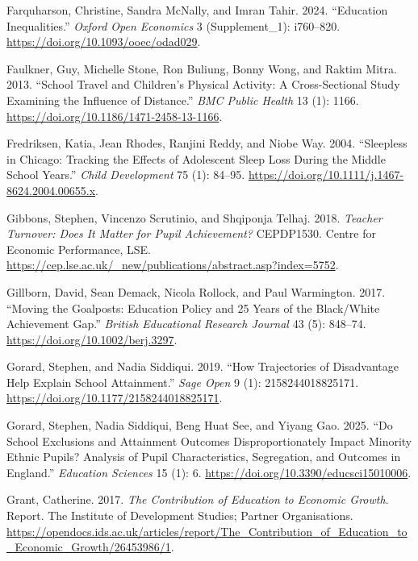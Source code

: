 \documentclass[
  12pt,
  titlepage]{article}
\newlength{\cslhangindent}
\newenvironment{CSLReferences}[2] %
 {\begin{list}{}{%
  \setlength{\itemindent}{0pt}
  \setlength{\leftmargin}{0pt}
  \setlength{\parsep}{0pt}
  \ifodd #1
   \setlength{\leftmargin}{\cslhangindent}
   \setlength{\itemindent}{-1\cslhangindent}
  \fi
  \setlength{\itemsep}{#2\baselineskip}}}
 {\end{list}}
\begin{document}
\begin{CSLReferences}{1}{1}
Farquharson, Christine, Sandra McNally, and Imran Tahir. 2024.
{``Education Inequalities.''} \emph{Oxford Open Economics} 3
(Supplement\_1): i760--820. \url{https://doi.org/10.1093/ooec/odad029}.

Faulkner, Guy, Michelle Stone, Ron Buliung, Bonny Wong, and Raktim
Mitra. 2013. {``School Travel and Children's Physical Activity: A
Cross-Sectional Study Examining the Influence of Distance.''} \emph{BMC
Public Health} 13 (1): 1166.
\url{https://doi.org/10.1186/1471-2458-13-1166}.

Fredriksen, Katia, Jean Rhodes, Ranjini Reddy, and Niobe Way. 2004.
{``Sleepless in {Chicago}: Tracking the Effects of Adolescent Sleep Loss
During the Middle School Years.''} \emph{Child Development} 75 (1):
84--95. \url{https://doi.org/10.1111/j.1467-8624.2004.00655.x}.

Gibbons, Stephen, Vincenzo Scrutinio, and Shqiponja Telhaj. 2018.
\emph{Teacher Turnover: Does It Matter for Pupil Achievement?}
CEPDP1530. Centre for Economic Performance, LSE.
\url{https://cep.lse.ac.uk/_new/publications/abstract.asp?index=5752}.

Gillborn, David, Sean Demack, Nicola Rollock, and Paul Warmington. 2017.
{``Moving the Goalposts: {Education} Policy and 25 Years of the
{Black}/{White} Achievement Gap.''} \emph{British Educational Research
Journal} 43 (5): 848--74. \url{https://doi.org/10.1002/berj.3297}.

Gorard, Stephen, and Nadia Siddiqui. 2019. {``How {Trajectories} of
{Disadvantage} {Help} {Explain} {School} {Attainment}.''} \emph{Sage
Open} 9 (1): 2158244018825171.
\url{https://doi.org/10.1177/2158244018825171}.

Gorard, Stephen, Nadia Siddiqui, Beng Huat See, and Yiyang Gao. 2025.
{``Do {School} {Exclusions} and {Attainment} {Outcomes}
{Disproportionately} {Impact} {Minority} {Ethnic} {Pupils}? {Analysis}
of {Pupil} {Characteristics}, {Segregation}, and {Outcomes} in
{England}.''} \emph{Education Sciences} 15 (1): 6.
\url{https://doi.org/10.3390/educsci15010006}.

Grant, Catherine. 2017. \emph{The {Contribution} of {Education} to
{Economic} {Growth}}. Report. The Institute of Development Studies;
Partner Organisations.
\url{https://opendocs.ids.ac.uk/articles/report/The_Contribution_of_Education_to_Economic_Growth/26453986/1}.


\end{CSLReferences}
\end{document}
